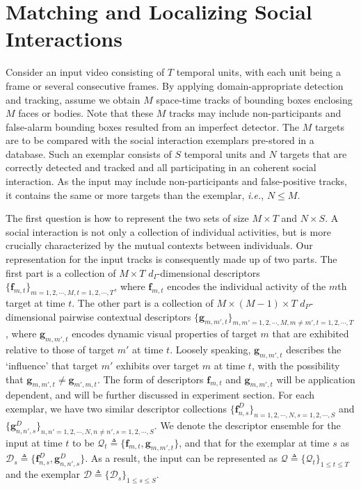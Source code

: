 \documentclass[10pt,twocolumn,letterpaper]{article}
\begin{document}
\section{Matching and Localizing Social Interactions}


Consider an input video consisting of $T$ temporal units, with each unit being a frame or several consecutive frames. By applying domain-appropriate detection and tracking, assume we obtain $M$ space-time tracks of bounding boxes enclosing $M$ faces or bodies. Note that these $M$ tracks may include non-participants and false-alarm bounding boxes resulted from an imperfect detector. The $M$ targets are to be compared with the social interaction exemplars pre-stored in a database. Such an exemplar consists of $S$ temporal units and $N$ targets that are correctly detected and tracked and all participating in an coherent social interaction. As the input may include non-participants and false-positive tracks, it contains the same or more targets than the exemplar, \textit{i.e.}, $N\leq M$.

The first question is how to represent the two sets of size $M\times T$ and $N\times S$. A social interaction is not only a collection of individual activities, but is more crucially characterized by the mutual contexts between individuals. Our representation for the input tracks is consequently made up of two parts. The first part is a collection of $M\times T$ $d_{I}$-dimensional descriptors $\{\mathbf{f}_{m,t}\}_{m=1,2,\cdots,M, t=1,2,\cdots,T}$, where $\mathbf{f}_{m,t}$ encodes the individual activity of the $m$th target at time $t$. The other part is a collection of $M\times (M-1)\times T$ $d_{P}$-dimensional pairwise contextual descriptors $\{\mathbf{g}_{m,m',t}\}_{m,m'=1,2,\cdots,M, m\neq m', t=1,2,\cdots,T}$, where $\mathbf{g}_{m,m',t}$ encodes dynamic visual properties of target $m$ that are exhibited relative to those of target $m'$ at time $t$. Loosely speaking, $\mathbf{g}_{m,m',t}$ describes the `influence' that target $m'$ exhibits over target $m$ at time $t$, with the possibility that $\mathbf{g}_{m,m',t}\ne\mathbf{g}_{m',m,t}$. The form of descriptors $\mathbf{f}_{m,t}$ and $\mathbf{g}_{m,m',t}$ will be application dependent, and will be further discussed in experiment section. For each exemplar, we have two similar descriptor collections $\{\mathbf{f}^{D}_{n,s}\}_{n=1,2,\cdots,N, s=1, 2,\cdots, S}$ and $\{\mathbf{g}^{D}_{n,n',s}\}_{n,n'=1,2,\cdots,N, n\neq n', s=1, 2,\cdots, S}$. We denote the descriptor ensemble for the input at time $t$ to be $\mathcal{Q}_{t}\triangleq\{\mathbf{f}_{m,t},\mathbf{g}_{m,m',t}\}$, and that for the exemplar at time $s$ as $\mathcal{D}_{s}\triangleq\{\mathbf{f}^{D}_{n,s},\mathbf{g}^{D}_{n,n',s}\} $. As a result, the input can be represented as $\mathcal{Q}\triangleq\{\mathcal{Q}_{t}\}_{1\leq t\leq T}$ and the exemplar $\mathcal{D}\triangleq\{\mathcal{D}_{s}\}_{1\leq s\leq S}$.
\end{document}
